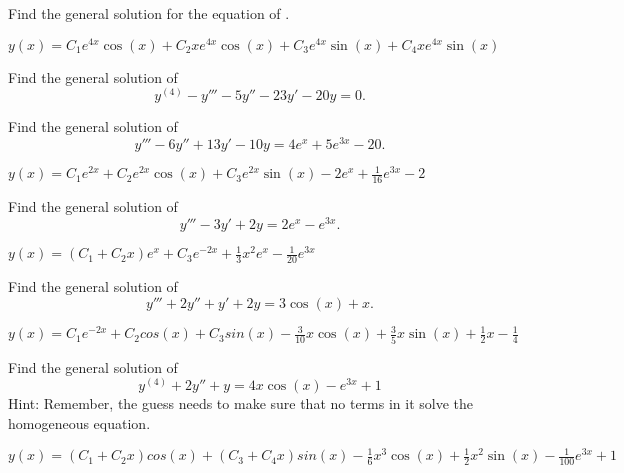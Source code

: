 \begin{exercise}
Find the general solution for the equation of .
\end{exercise}
\comboSol{%
}
{%
$y(x) = C_1e^{4x}\cos(x) + C_2xe^{4x}\cos(x) + C_3e^{4x}\sin(x) + C_4xe^{4x}\sin(x)$
}

\begin{exercise}\ansMark%
Find the general solution of
\begin{equation*}
y^{(4)} - y''' - 5y'' - 23y' - 20y = 0.
\end{equation*}
\end{exercise}

\begin{exercise}
Find the general solution of
\begin{equation*}
y''' - 6y'' + 13y' - 10y = 4e^x + 5e^{3x} - 20.
\end{equation*}
\end{exercise}
\comboSol{%
}
{%
$y(x) = C_1 e^{2x} + C_2e^{2x}\cos(x) + C_3e^{2x}\sin(x) - 2e^x + \frac{1}{16}e^{3x} - 2$
}


\begin{exercise}
Find the general solution of
\begin{equation*}
y''' - 3y' + 2y = 2e^{x} - e^{3x}.
\end{equation*}
\end{exercise}
\comboSol{%
}
{%
$y(x) = (C_1 + C_2x)e^{x} + C_3e^{-2x} + \frac{1}{3}x^2e^x - \frac{1}{20}e^{3x}$
}


\begin{exercise}
Find the general solution of
\begin{equation*}
y''' + 2y'' + y' + 2y = 3\cos(x) + x.
\end{equation*}
\end{exercise}
\comboSol{%
}
{%
$y(x) =  C_1e^{-2x} + C_2cos(x) + C_3sin(x) - \frac{3}{10}x\cos(x) + \frac{3}{5}x\sin(x) + \frac{1}{2}x - \frac{1}{4}$
}

\begin{exercise}
Find the general solution of 
\begin{equation*}
y^{(4)}  + 2y'' + y = 4x\cos(x) - e^{3x} + 1
\end{equation*}
Hint: Remember, the guess needs to make sure that no terms in it solve the homogeneous equation.
\end{exercise}
\comboSol{%
}
{%
$y(x) = (C_1 + C_2x)cos(x) + (C_3 + C_4x)sin(x) - \frac{1}{6}x^3\cos(x) + \frac{1}{2}x^2\sin(x) - \frac{1}{100}e^{3x} + 1$
}



